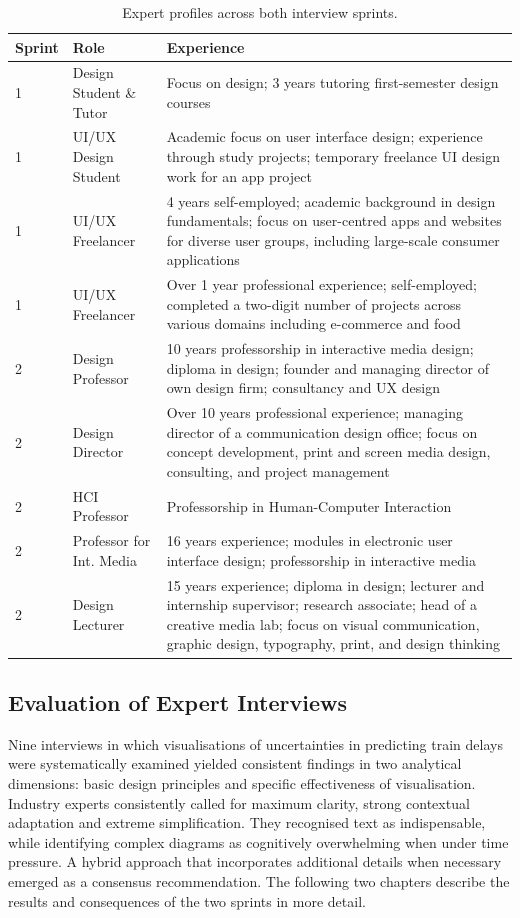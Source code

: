 \documentclass[final,journal,a4paper]{IEEEtran}
\begin{document}
\begin{table}[ht]
\centering
\caption{Expert profiles across both interview sprints.}
\label{tab:expert-profiles}
\begin{tabular}{p{0.5cm}p{2.5cm}p{4.5cm}}
\toprule
Sprint & Role & Experience \\
\midrule
1 & Design Student \& Tutor & Focus on design; 3 years tutoring first-semester design courses \\
1 & UI/UX Design Student & Academic focus on user interface design; experience through study projects; temporary freelance UI design work for an app project \\
1 & UI/UX Freelancer & 4 years self-employed; academic background in design fundamentals; focus on user-centred apps and websites for diverse user groups, including large-scale consumer applications \\
1 & UI/UX Freelancer & Over 1 year professional experience; self-employed; completed a two-digit number of projects across various domains including e-commerce and food \\
\midrule
2 & Design Professor & 10 years professorship in interactive media design; diploma in design; founder and managing director of own design firm; consultancy and UX design \\
2 & Design Director & Over 10 years professional experience; managing director of a communication design office; focus on concept development, print and screen media design, consulting, and project management \\
2 & HCI Professor & Professorship in Human-Computer Interaction \\
2 & Professor for Int. Media & 16 years experience; modules in electronic user interface design; professorship in interactive media \\
2 & Design Lecturer & 15 years experience; diploma in design; lecturer and internship supervisor; research associate; head of a creative media lab; focus on visual communication, graphic design, typography, print, and design thinking \\
\bottomrule
\end{tabular}
\end{table}

\subsection{Evaluation of Expert Interviews}
Nine interviews in which visualisations of uncertainties in predicting train delays were systematically examined yielded consistent findings in two analytical dimensions: basic design principles and specific effectiveness of visualisation. Industry experts consistently called for maximum clarity, strong contextual adaptation and extreme simplification. They recognised text as indispensable, while identifying complex diagrams as cognitively overwhelming when under time pressure. A hybrid approach that incorporates additional details when necessary emerged as a consensus recommendation. The following two chapters describe the results and consequences of the two sprints in more detail.
\end{document}
